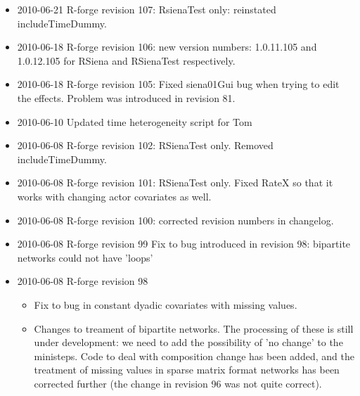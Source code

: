\documentclass[a4paper,fleqn,11pt]{article}
\newcommand{\+}{\, + \,}
\begin{document}
{\begin{small}
\begin{itemize}
\begin{itemize}
  argument includeOnly so you can print lines which are not currently included.
\item effectsDocumentation was failing due to timeDummy column
\item New average alter effects
\item Corrected format of error message if unlikely to finish epoch/
\item Corrected print report for multiple groups via the GUI, and for 8 waves.
\item Fixed names for used defined dyadic interactions.
\item Fixed bug where SienaTimeTest dummies with RateX would not work with
  changing covariates.
\end{itemize}
\item 2010-06-21 R-forge revision 107: RsienaTest only: reinstated
includeTimeDummy.
\item 2010-06-18 R-forge revision 106: new version numbers:
  1.0.11.105 and 1.0.12.105 for RSiena and RSienaTest respectively.
\item 2010-06-18 R-forge revision 105: Fixed siena01Gui bug when trying to edit
  the effects. Problem was introduced in revision 81.
\item 2010-06-10 Updated time heterogeneity script for Tom
\item 2010-06-08 R-forge revision 102: RSienaTest only. Removed
includeTimeDummy.
\item 2010-06-08 R-forge revision 101: RSienaTest only. Fixed RateX so that it
  works with changing actor covariates as well.
\item 2010-06-08 R-forge revision 100: corrected revision numbers in changelog.
\item 2010-06-08 R-forge revision 99
Fix to bug introduced in revision 98: bipartite networks could not have 'loops'
\item 2010-06-08 R-forge revision 98
\begin{itemize}
\item Fix to bug in constant dyadic covariates with missing values.
\item Changes to treament of bipartite networks. The processing of these is
  still under development: we need to add the possibility of 'no change' to the
  ministeps. Code to deal with composition change has been added, and the
  treatment of missing values in sparse matrix format networks has been
  corrected further (the change in revision 96 was not quite correct).
\end{itemize}

\end{itemize}
\end{small}}
\end{document}
